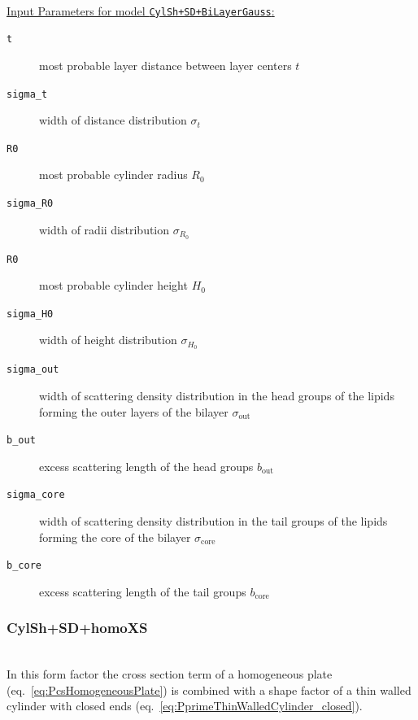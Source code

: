 \hspace{1pt}\\
\uline{Input Parameters for model \texttt{CylSh+SD+BiLayerGauss}:}\\
\begin{description}
\item[\texttt{t}] most probable layer distance between layer centers $t$
\item[\texttt{sigma\_t}] width of distance distribution $\sigma_t$
\item[\texttt{R0}] most probable cylinder radius $R_0$
\item[\texttt{sigma\_R0}] width of radii distribution $\sigma_{R_0}$
\item[\texttt{R0}] most probable cylinder height $H_0$
\item[\texttt{sigma\_H0}] width of height distribution $\sigma_{H_0}$
\item[\texttt{sigma\_out}] width of scattering density distribution in the head groups of the lipids forming the outer layers of the bilayer $\sigma_\mathrm{out}$
\item[\texttt{b\_out}] excess scattering length of the head groups $b_\mathrm{out}$
\item[\texttt{sigma\_core}] width of scattering density distribution in the tail groups of the lipids forming the core of the bilayer $\sigma_\mathrm{core}$
\item[\texttt{b\_core}] excess scattering length of the tail groups $b_\mathrm{core}$
\end{description}

\vspace{5mm}

\noindent
\subsubsection{CylSh+SD+homoXS} ~\\

\noindent
In this form factor the cross section term of a homogeneous plate (eq.\ \ref{eq:PcsHomogeneousPlate}) is combined with a shape factor of a thin walled cylinder with closed ends (eq.\ \ref{eq:PprimeThinWalledCylinder_closed}).

\vspace{5mm}

